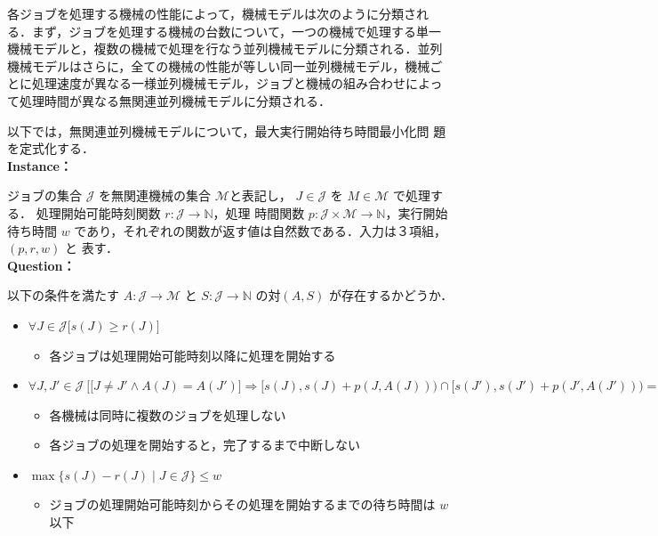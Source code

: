 \documentclass[12pt]{optlab-bachelor}
\begin{document}
各ジョブを処理する機械の性能によって，機械モデルは次のように分類され
る．まず，ジョブを処理する機械の台数について，一つの機械で処理する単一
機械モデルと，複数の機械で処理を行なう並列機械モデルに分類される．並列
機械モデルはさらに，全ての機械の性能が等しい同一並列機械モデル，機械ご
とに処理速度が異なる一様並列機械モデル，ジョブと機械の組み合わせによっ
て処理時間が異なる無関連並列機械モデルに分類される．

以下では，無関連並列機械モデルについて，最大実行開始待ち時間最小化問
題を定式化する．\\

\noindent \textbf{Instance：}

ジョブの集合 $\mathcal{J}$ を無関連機械の集合 $\mathcal{M}$と表記し，
$J \in \mathcal{J}$ を $M \in \mathcal{M}$ で処理する．
処理開始可能時刻関数 $r : \mathcal{J} \to \mathbb{N}$，処理
時間関数 $p : \mathcal{J} \times \mathcal{M} \to \mathbb{N}$，実行開始
待ち時間 $w$ であり，それぞれの関数が返す値は自然数である．入力は３項組，$(p,r,w)$ と
表す．\\

\noindent \textbf{Question：}

以下の条件を満たす $A : \mathcal{J} \to \mathcal{M}$ と $S : \mathcal{J} \to
\mathbb{N}$ の対$(A,S)$ が存在するかどうか．
\begin{itemize}
\item $\forall J \in \mathcal{J}\big[s(J) \ge r(J) \big]$
  \begin{itemize}
  \item 各ジョブは処理開始可能時刻以降に処理を開始する
  \end{itemize}
\item $\forall J, J' \in \mathcal{J}\ \Big[ \big[J\ne J' \land A(J) = A(J')\big] \Rightarrow [s(J), s(J)+p(J,A(J))) \cap[s(J'), s(J')+p(J', A(J'))) = \emptyset \Big]$
  \begin{itemize}
  \item 各機械は同時に複数のジョブを処理しない
  \item 各ジョブの処理を開始すると，完了するまで中断しない
  \end{itemize}
\item $\max\big\{s(J) - r(J) \mid J \in \mathcal{J}\big\} \le w$
  \begin{itemize}
  \item ジョブの処理開始可能時刻からその処理を開始するまでの待ち時間は $w$ 以下
  \end{itemize}
\end{itemize}
\end{document}
